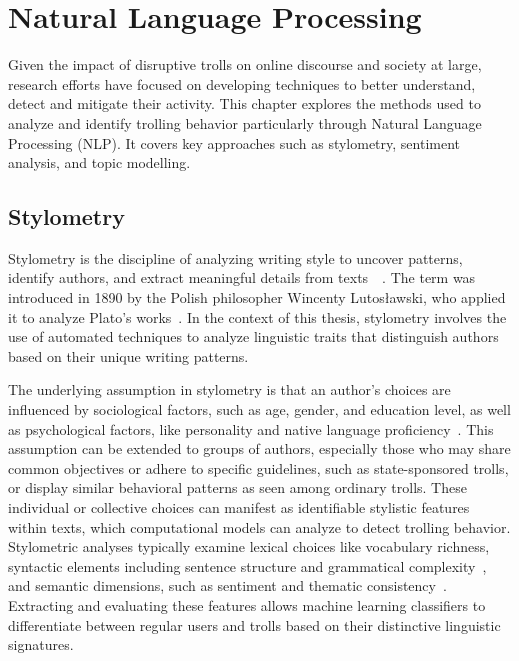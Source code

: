 \documentclass[twoside]{ctuthesis}
\theoremstyle{plain}
\theoremstyle{definition}
\theoremstyle{note}
\begin{document}
\chapter{Natural Language Processing}
Given the impact of disruptive trolls on online discourse and society at large, research efforts have focused on developing techniques to better understand, detect and mitigate their activity. This chapter explores the methods used to analyze and identify trolling behavior particularly through Natural Language Processing (NLP). It covers key approaches such as stylometry, sentiment analysis, and topic modelling.\par

\section{Stylometry}

Stylometry is the discipline of analyzing writing style to uncover patterns, identify authors, and extract meaningful details from texts~\cite{Mosteller1964Federalist}~\cite{Pascucci2020Misogyny}. The term was introduced in 1890 by the Polish philosopher Wincenty Lutosławski, who applied it to analyze Plato's works~\cite{Lutoslawski1898}. In the context of this thesis,  stylometry involves the use of automated techniques to analyze linguistic traits that distinguish authors based on their unique writing patterns.\par
The underlying assumption in stylometry is that an author's choices are influenced by sociological factors, such as age, gender, and education level, as well as psychological factors, like personality and native language proficiency~\cite{Daelemans2013Explanation}. This assumption can be extended to groups of authors, especially those who may share common objectives or adhere to specific guidelines, such as state-sponsored trolls, or display similar behavioral patterns as seen among ordinary trolls. These individual or collective choices can manifest as identifiable stylistic features within texts, which computational models can analyze to detect trolling behavior.
Stylometric analyses typically examine lexical choices like vocabulary richness, syntactic elements including sentence structure and grammatical complexity~\cite{Sari2018Features}, and semantic dimensions, such as sentiment and thematic consistency~\cite{PerezRosas2018Stylometry}. Extracting and evaluating these features allows machine learning classifiers to differentiate between regular users and trolls based on their distinctive linguistic signatures.\par
\end{document}
